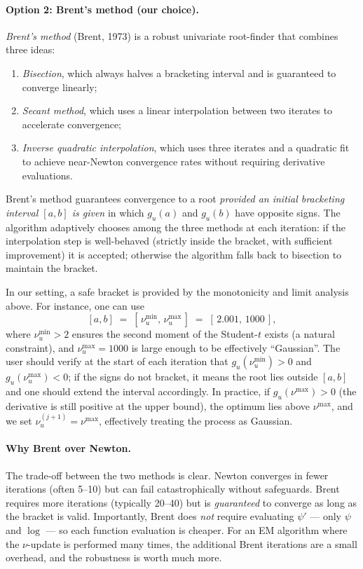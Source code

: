 \documentclass[11pt, a4paper, oneside]{article}
\begin{document}
\paragraph{Option 2: Brent's method (our choice).}
\emph{Brent's method} (Brent, 1973) is a robust univariate
root-finder that combines three ideas:
\begin{enumerate}[leftmargin=1.5em, itemsep=2pt]
    \item \emph{Bisection}, which always halves a bracketing interval
          and is guaranteed to converge linearly;
    \item \emph{Secant method}, which uses a linear interpolation
          between two iterates to accelerate convergence;
    \item \emph{Inverse quadratic interpolation}, which uses three
          iterates and a quadratic fit to achieve near-Newton
          convergence rates without requiring derivative evaluations.
\end{enumerate}
Brent's method guarantees convergence to a root \emph{provided an
initial bracketing interval $[a, b]$ is given} in which $g_u(a)$ and
$g_u(b)$ have opposite signs. The algorithm adaptively chooses among
the three methods at each iteration: if the interpolation step is
well-behaved (strictly inside the bracket, with sufficient
improvement) it is accepted; otherwise the algorithm falls back to
bisection to maintain the bracket.

In our setting, a safe bracket is provided by the monotonicity and
limit analysis above. For instance, one can use
\[
[a, b] \;=\; [\,\nu_u^{\min},\, \nu_u^{\max}\,]
\;=\; [\,2.001,\, 1000\,],
\]
where $\nu_u^{\min} > 2$ ensures the second moment of the Student-$t$
exists (a natural constraint), and $\nu_u^{\max} = 1000$ is large
enough to be effectively ``Gaussian''. The user should verify at the
start of each iteration that $g_u(\nu_u^{\min}) > 0$ and
$g_u(\nu_u^{\max}) < 0$; if the signs do not bracket, it means the
root lies outside $[a, b]$ and one should extend the interval
accordingly.
In practice, if $g_u(\nu^{\max}) > 0$ (the derivative is still
positive at the upper bound), the optimum lies above $\nu^{\max}$,
and we set $\nu_u^{(j+1)} = \nu^{\max}$, effectively treating the
process as Gaussian.

\paragraph{Why Brent over Newton.}
The trade-off between the two methods is clear. Newton converges in
fewer iterations (often 5--10) but can fail catastrophically without
safeguards. Brent requires more iterations (typically 20--40) but is
\emph{guaranteed} to converge as long as the bracket is valid.
Importantly, Brent does \emph{not} require evaluating $\psi'$ — only
$\psi$ and $\log$ — so each function evaluation is cheaper. For an EM
algorithm where the $\nu$-update is performed many times, the
additional Brent iterations are a small overhead, and the robustness
is worth much more.
\end{document}
